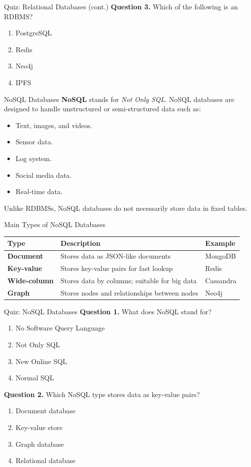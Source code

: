 \documentclass[aspectratio=169,11pt]{beamer}
\newcommand{\keyword}[1]{\textcolor{accent}{\textbf{#1}}}
\newcommand{\tightlist}{\setlength{\itemsep}{2pt}\setlength{\parskip}{0pt}}
\newcommand{\qoption}[2]{\item[#1.] #2}
\begin{document}
\begin{frame}{Quiz: Relational Databases (cont.)}
\small
\textbf{Question 3.} Which of the following is an RDBMS?
\begin{enumerate}
\tightlist
  \qoption{A}{PostgreSQL}
  \qoption{B}{Redis}
  \qoption{C}{Neo4j}
  \qoption{D}{IPFS}
\end{enumerate}
\end{frame}

\begin{frame}{NoSQL Databases}
\small
\keyword{NoSQL} stands for \textit{Not Only SQL}. NoSQL databases are designed to handle unstructured or semi-structured data such as:
\begin{itemize}
\tightlist
  \item Text, images, and videos.
  \item Sensor data.
  \item Log system.
  \item Social media data.
  \item Real-time data.
\end{itemize}

Unlike RDBMSs, NoSQL databases do not necessarily store data in fixed tables.
\end{frame}

\begin{frame}{Main Types of NoSQL Databases}
\small
\begin{tabularx}{\textwidth}{>{\bfseries}p{} X p{}}
\toprule
Type & Description & Example \\
\midrule
Document & Stores data as JSON-like documents & MongoDB \\
Key-value & Stores key-value pairs for fast lookup & Redis \\
Wide-column & Stores data by columns; suitable for big data & Cassandra \\
Graph & Stores nodes and relationships between nodes & Neo4j \\
\bottomrule
\end{tabularx}
\end{frame}

\begin{frame}{Quiz: NoSQL Databases}
\small
\textbf{Question 1.} What does NoSQL stand for?
\begin{enumerate}
\tightlist
  \qoption{A}{No Software Query Language}
  \qoption{B}{Not Only SQL}
  \qoption{C}{New Online SQL}
  \qoption{D}{Normal SQL}
\end{enumerate}

\textbf{Question 2.} Which NoSQL type stores data as key-value pairs?
\begin{enumerate}
\tightlist
  \qoption{A}{Document database}
  \qoption{B}{Key-value store}
  \qoption{C}{Graph database}
  \qoption{D}{Relational database}
\end{enumerate}
\end{frame}
\end{document}
